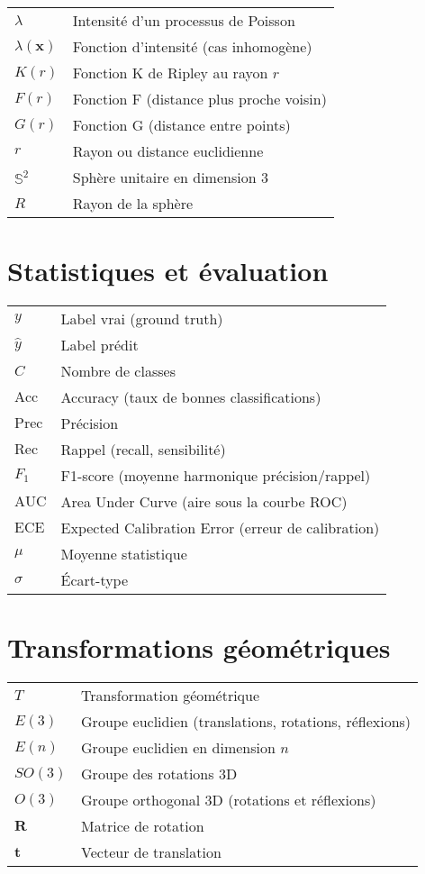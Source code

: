 \begin{tabular}{p{2.5cm} p{11cm}}
  \hline
  $\lambda$ & Intensité d'un processus de Poisson\\
  $\lambda(\mathbf{x})$ & Fonction d'intensité (cas inhomogène)\\
  $K(r)$ & Fonction K de Ripley au rayon $r$\\
  $F(r)$ & Fonction F (distance plus proche voisin)\\
  $G(r)$ & Fonction G (distance entre points)\\
  $r$ & Rayon ou distance euclidienne\\
  $\mathbb{S}^2$ & Sphère unitaire en dimension 3\\
  $R$ & Rayon de la sphère\\
  \hline
\end{tabular}

\section*{Statistiques et évaluation}

\begin{tabular}{p{2.5cm} p{11cm}}
  \hline
  $y$ & Label vrai (ground truth)\\
  $\hat{y}$ & Label prédit\\
  $C$ & Nombre de classes\\
  $\text{Acc}$ & Accuracy (taux de bonnes classifications)\\
  $\text{Prec}$ & Précision\\
  $\text{Rec}$ & Rappel (recall, sensibilité)\\
  $F_1$ & F1-score (moyenne harmonique précision/rappel)\\
  $\text{AUC}$ & Area Under Curve (aire sous la courbe ROC)\\
  $\text{ECE}$ & Expected Calibration Error (erreur de calibration)\\
  $\mu$ & Moyenne statistique\\
  $\sigma$ & Écart-type\\
  \hline
\end{tabular}

\section*{Transformations géométriques}

\begin{tabular}{p{2.5cm} p{11cm}}
  \hline
  $T$ & Transformation géométrique\\
  $E(3)$ & Groupe euclidien (translations, rotations, réflexions)\\
  $E(n)$ & Groupe euclidien en dimension $n$\\
  $SO(3)$ & Groupe des rotations 3D\\
  $O(3)$ & Groupe orthogonal 3D (rotations et réflexions)\\
  $\mathbf{R}$ & Matrice de rotation\\
  $\mathbf{t}$ & Vecteur de translation\\
  \hline
\end{tabular}

